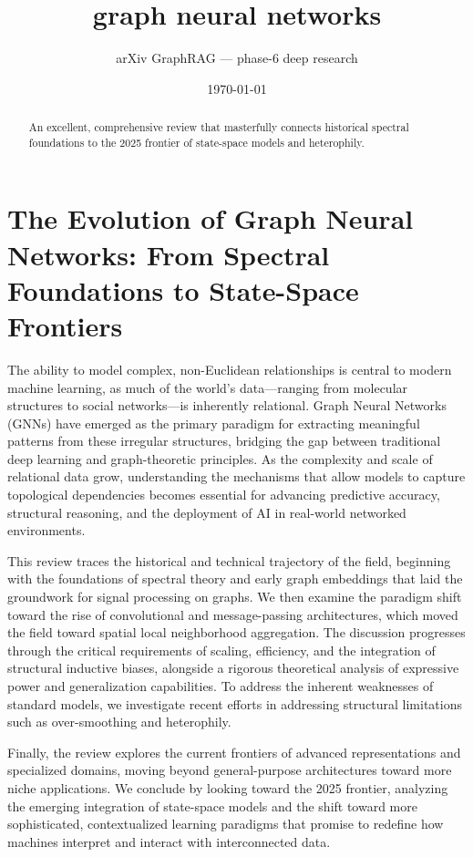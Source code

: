 \documentclass[11pt]{article}
\title{graph neural networks}
\author{arXiv GraphRAG --- phase-6 deep research}
\date{\today}
\begin{document}
\maketitle

\begin{abstract}
An excellent, comprehensive review that masterfully connects historical spectral foundations to the 2025 frontier of state-space models and heterophily.
\end{abstract}

\section{The Evolution of Graph Neural Networks: From Spectral Foundations to State-Space Frontiers}

The ability to model complex, non-Euclidean relationships is central to modern machine learning, as much of the world's data—ranging from molecular structures to social networks—is inherently relational. Graph Neural Networks (GNNs) have emerged as the primary paradigm for extracting meaningful patterns from these irregular structures, bridging the gap between traditional deep learning and graph-theoretic principles. As the complexity and scale of relational data grow, understanding the mechanisms that allow models to capture topological dependencies becomes essential for advancing predictive accuracy, structural reasoning, and the deployment of AI in real-world networked environments.

This review traces the historical and technical trajectory of the field, beginning with the foundations of spectral theory and early graph embeddings that laid the groundwork for signal processing on graphs. We then examine the paradigm shift toward the rise of convolutional and message-passing architectures, which moved the field toward spatial local neighborhood aggregation. The discussion progresses through the critical requirements of scaling, efficiency, and the integration of structural inductive biases, alongside a rigorous theoretical analysis of expressive power and generalization capabilities. To address the inherent weaknesses of standard models, we investigate recent efforts in addressing structural limitations such as over-smoothing and heterophily.

Finally, the review explores the current frontiers of advanced representations and specialized domains, moving beyond general-purpose architectures toward more niche applications. We conclude by looking toward the 2025 frontier, analyzing the emerging integration of state-space models and the shift toward more sophisticated, contextualized learning paradigms that promise to redefine how machines interpret and interact with interconnected data.
\end{document}
